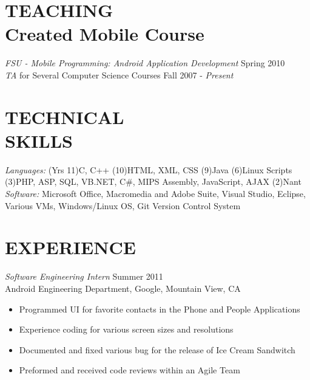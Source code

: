 \documentclass[margin]{res}
\begin{document}
\begin{resume}
\section{TEACHING \\ Created Mobile Course} {\sl FSU - Mobile Programming: Android Application Development} \hfill Spring 2010\\
{\it TA} for Several Computer Science Courses \hfill Fall 2007 - \textit{Present}



\section{TECHNICAL \\ SKILLS} 

{\sl Languages:}
(Yrs 11)C, C++
(10)HTML, XML, CSS
(9)Java
(6)Linux Scripts 
(3)PHP, ASP, SQL, VB.NET, C\#, MIPS Assembly, JavaScript, AJAX
(2)Nant 
\\{\sl Software:}
Microsoft Office, Macromedia and Adobe Suite,
Visual Studio, Eclipse,
Various VMs,
Windows/Linux OS,
Git Version Control System


\section{EXPERIENCE} 

{\sl Software Engineering Intern} \hfill     Summer 2011 \\
Android Engineering Department, Google, Mountain View, CA
\begin{itemize} \itemsep -5pt
\item Programmed UI for favorite contacts in the Phone and People Applications
\item Experience coding for various screen sizes and resolutions 
\item Documented and fixed various bug for the release of Ice Cream Sandwitch
\item Preformed and received code reviews within an Agile Team
\end{itemize}


\end{resume}
\end{document}
